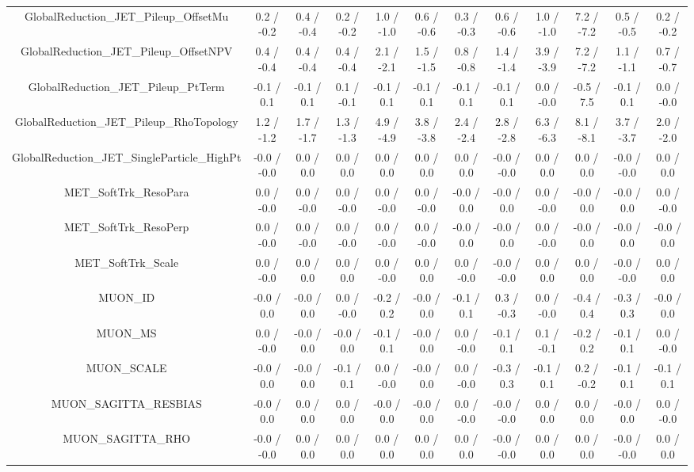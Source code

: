 \begin{table}[htbp]
\begin{center}
\begin{tabular}{|c|c|c|c|c|c|c|c|c|c|c|c|}
  GlobalReduction_JET_Pileup_OffsetMu & 0.2 / -0.2 & 0.4 / -0.4 & 0.2 / -0.2 & 1.0 / -1.0 & 0.6 / -0.6 & 0.3 / -0.3 & 0.6 / -0.6 & 1.0 / -1.0 & 7.2 / -7.2 & 0.5 / -0.5 & 0.2 / -0.2 \\ 
  GlobalReduction_JET_Pileup_OffsetNPV & 0.4 / -0.4 & 0.4 / -0.4 & 0.4 / -0.4 & 2.1 / -2.1 & 1.5 / -1.5 & 0.8 / -0.8 & 1.4 / -1.4 & 3.9 / -3.9 & 7.2 / -7.2 & 1.1 / -1.1 & 0.7 / -0.7 \\ 
  GlobalReduction_JET_Pileup_PtTerm & -0.1 / 0.1 & -0.1 / 0.1 & 0.1 / -0.1 & -0.1 / 0.1 & -0.1 / 0.1 & -0.1 / 0.1 & -0.1 / 0.1 & 0.0 / -0.0 & -0.5 / 7.5 & -0.1 / 0.1 & 0.0 / -0.0 \\ 
  GlobalReduction_JET_Pileup_RhoTopology & 1.2 / -1.2 & 1.7 / -1.7 & 1.3 / -1.3 & 4.9 / -4.9 & 3.8 / -3.8 & 2.4 / -2.4 & 2.8 / -2.8 & 6.3 / -6.3 & 8.1 / -8.1 & 3.7 / -3.7 & 2.0 / -2.0 \\ 
  GlobalReduction_JET_SingleParticle_HighPt & -0.0 / -0.0 & 0.0 / 0.0 & 0.0 / 0.0 & 0.0 / 0.0 & 0.0 / 0.0 & 0.0 / 0.0 & -0.0 / -0.0 & 0.0 / 0.0 & 0.0 / 0.0 & -0.0 / -0.0 & 0.0 / 0.0 \\ 
  MET_SoftTrk_ResoPara & 0.0 / -0.0 & 0.0 / -0.0 & 0.0 / -0.0 & 0.0 / -0.0 & 0.0 / -0.0 & -0.0 / 0.0 & -0.0 / 0.0 & 0.0 / -0.0 & -0.0 / 0.0 & -0.0 / 0.0 & 0.0 / -0.0 \\ 
  MET_SoftTrk_ResoPerp & 0.0 / -0.0 & 0.0 / -0.0 & 0.0 / -0.0 & 0.0 / -0.0 & 0.0 / -0.0 & -0.0 / 0.0 & -0.0 / 0.0 & 0.0 / -0.0 & -0.0 / 0.0 & -0.0 / 0.0 & -0.0 / 0.0 \\ 
  MET_SoftTrk_Scale & 0.0 / -0.0 & 0.0 / 0.0 & 0.0 / 0.0 & 0.0 / -0.0 & 0.0 / 0.0 & 0.0 / -0.0 & -0.0 / -0.0 & 0.0 / 0.0 & 0.0 / 0.0 & -0.0 / -0.0 & 0.0 / 0.0 \\ 
  MUON_ID & -0.0 / 0.0 & -0.0 / 0.0 & 0.0 / -0.0 & -0.2 / 0.2 & -0.0 / 0.0 & -0.1 / 0.1 & 0.3 / -0.3 & 0.0 / -0.0 & -0.4 / 0.4 & -0.3 / 0.3 & -0.0 / 0.0 \\ 
  MUON_MS & 0.0 / -0.0 & -0.0 / 0.0 & -0.0 / 0.0 & -0.1 / 0.1 & -0.0 / 0.0 & 0.0 / -0.0 & -0.1 / 0.1 & 0.1 / -0.1 & -0.2 / 0.2 & -0.1 / 0.1 & 0.0 / -0.0 \\ 
  MUON_SCALE & -0.0 / 0.0 & -0.0 / 0.0 & -0.1 / 0.1 & 0.0 / -0.0 & -0.0 / 0.0 & 0.0 / -0.0 & -0.3 / 0.3 & -0.1 / 0.1 & 0.2 / -0.2 & -0.1 / 0.1 & -0.1 / 0.1 \\ 
  MUON_SAGITTA_RESBIAS & -0.0 / 0.0 & 0.0 / 0.0 & 0.0 / 0.0 & -0.0 / 0.0 & -0.0 / 0.0 & 0.0 / -0.0 & -0.0 / -0.0 & 0.0 / 0.0 & 0.0 / 0.0 & -0.0 / 0.0 & 0.0 / -0.0 \\ 
  MUON_SAGITTA_RHO & -0.0 / -0.0 & 0.0 / 0.0 & 0.0 / 0.0 & 0.0 / 0.0 & 0.0 / 0.0 & 0.0 / 0.0 & -0.0 / -0.0 & 0.0 / 0.0 & 0.0 / 0.0 & -0.0 / -0.0 & 0.0 / 0.0 \\ 

\end{tabular}
\end{center}
\end{table}
